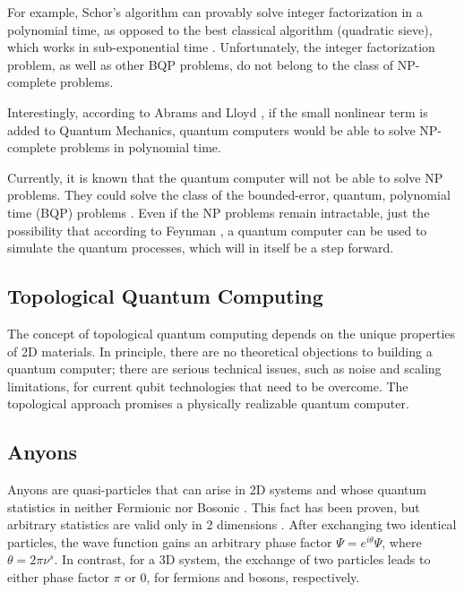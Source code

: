 For example, Schor's algorithm \cite{Schor} can provably solve integer factorization in a polynomial time, as opposed to the best classical algorithm (quadratic sieve), which works in sub-exponential time \cite{Pomerance}. Unfortunately, the integer factorization problem, as well as other BQP problems, do not belong to the class of NP-complete problems. 

Interestingly, according to Abrams and Lloyd \cite{Abrams_1998}, \cite{Abrams_1999} if the small nonlinear term is added to Quantum Mechanics, quantum computers would be able to solve NP-complete problems in polynomial time.

Currently, it is known that the quantum computer will not be able to solve NP problems. They could solve the class of the bounded-error, quantum, polynomial time (BQP) problems \cite{BQP}. 
Even if the NP problems remain intractable, just the possibility that according to Feynman \cite{FQC}, a quantum computer can be used to simulate the quantum processes, which will in itself be a step forward. 

\subsection*{Topological Quantum Computing}
The concept of topological quantum computing \cite{Tqc1}
depends on the unique properties of 2D materials.  In principle, there are no theoretical objections to building a quantum computer; there are serious technical issues, such as noise and scaling limitations, for current qubit technologies that need to be overcome\cite{QCProblems}. 
The topological approach promises a physically realizable quantum computer\cite{Tqc2,Tqc3}. 

\subsection*{Anyons}
Anyons are quasi-particles that can arise in 2D systems and whose quantum statistics in neither Fermionic nor Bosonic \cite{Anyons1}.  This fact has been proven\cite{Anyons2}, but
arbitrary statistics are valid only in 2 dimensions \cite{Walsh}. After exchanging two identical particles, the wave function gains an arbitrary phase factor $ \Psi = e^{i\theta}\Psi $, where $ \theta = 2\pi\nu^{s} $. In contrast, for a 3D system, the exchange of two particles leads to either phase factor $ \pi $ or $ 0 $, for fermions and bosons, respectively.


